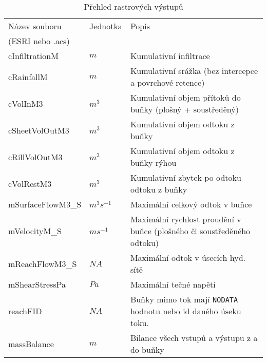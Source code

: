 

\begin{table}[t]
 

 \centering
 \caption{Přehled rastrových výstupů}
\label{tab:vystupyrast}

 \begin{tabular}{llp{}}
 \hline
  Název souboru    & Jednotka    & Popis       \\ 
  (ESRI nebo .acs)    &     &        \\ \hline \hline
  cInfiltrationM      &   $m$        & Kumulativní infiltrace \\
  cRainfallM          &  $m$    &  Kumulativní srážka (bez intercepce a povrchové retence) \\
  cVolInM3            &  $m^3$  & Kumulativní objem přítoků do buňky  (plošný + soustředěný) \\
  cSheetVolOutM3      &  $m^3$  & Kumulativní objem odtoku z buňky \\
  cRillVolOutM3       &  $m^3$  & Kumulativní objem odtoku z buňky rýhou \\
  cVolRestM3          &  $m^3$  & Kumulativní zbytek po odtoku odtoku z buňky\\
  mSurfaceFlowM3\_S   &   $m^3s^{-1}$	&  Maximální celkový odtok v buňce\\
  mVelocityM\_S       &   $ms^{-1}$	&  Maximální rychlost proudění v buňce (plošného či soustředěného odtoku) \\
  mReachFlowM3\_S     &  $NA$ & Maximální odtok v úsecích hyd. sítě  \\
  mShearStressPa      & $Pa$ &  Maximální tečné napětí \\
  reachFID            &  $NA$ &  Buňky mimo tok mají {\tt NODATA} hodnotu nebo id daného úseku toku.  \\
  massBalance         &   $m$  &  Bilance všech vstupů a výstupu z a do buňky  \\
  \hline

 \end{tabular}
 

\end{table}





